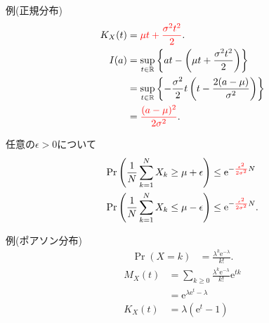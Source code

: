 \documentclass[lualatex,handout]{beamer}
\newcommand{\emm}[1]{\textcolor{red}{#1}}
\theoremstyle{definition}
\begin{document}
\begin{frame}{例(正規分布)}
\begin{align*}
K_X(t) &= \emm{\mu t + \frac{\sigma^2t^2}2}.\\
I(a)&=\sup_{t\in\mathbb{R}} \left\{at - \left(\mu t + \frac{\sigma^2t^2}2\right)\right\}\\
&= \sup_{t\in\mathbb{R}} \left\{-\frac{\sigma^2}2 t\left(t-\frac{2(a-\mu)}{\sigma^2}\right) \right\}\\
&=\emm{\frac{(a-\mu)^2}{2\sigma^2}}.
\end{align*}

\vspace{1em}
任意の$\epsilon>0$について
\begin{align*}
\Pr\left(\frac1N\sum_{k=1}^N X_k \ge \mu + \epsilon\right) &\le \mathrm{e}^{-\emm{\frac{\epsilon^2}{2\sigma^2}}N}\\
\Pr\left(\frac1N\sum_{k=1}^N X_k \le \mu - \epsilon\right) &\le \mathrm{e}^{-\emm{\frac{\epsilon^2}{2\sigma^2}}N}.
\end{align*}
\end{frame}

\begin{frame}{例(ポアソン分布)}
\begin{align*}
\Pr(X=k) &= \frac{\lambda^k\mathrm{e}^{-\lambda}}{k!}.
\end{align*}
\begin{align*}
M_X(t) &= \sum_{k\ge 0}\frac{\lambda^k\mathrm{e}^{-\lambda}}{k!} \mathrm{e}^{tk}\\
&= \mathrm{e}^{\lambda\mathrm{e}^t - \lambda}\\
K_X(t) &= \lambda(\mathrm{e}^t-1)
\end{align*}
\end{frame}
\end{document}
